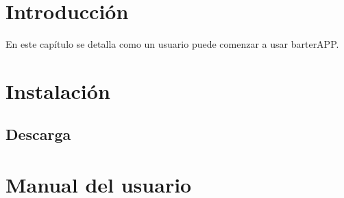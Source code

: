 
\section{Introducción}\label{introduccion-usuario}
En este capítulo se detalla como un usuario puede comenzar a usar barterAPP.

\section{Instalación}\label{instalacion-app}
\subsection{Descarga}\label{descarga}

\section{Manual del usuario}\label{manual-usuario}


